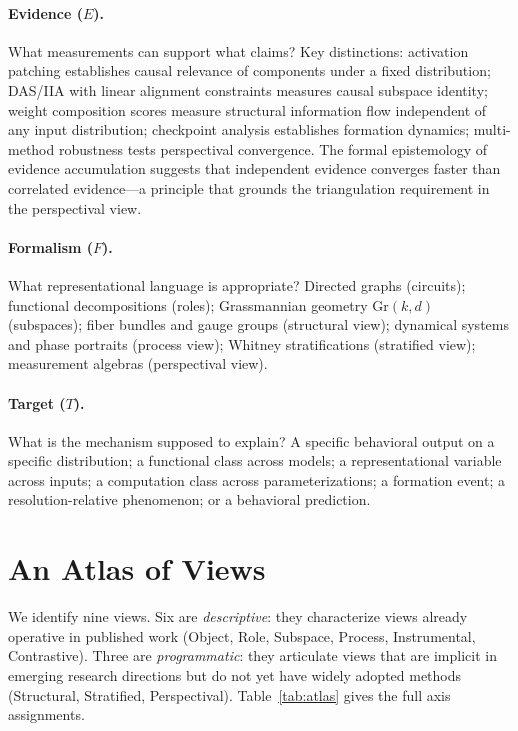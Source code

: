\documentclass{article}
\newcommand{\Gr}{\mathrm{Gr}}
\begin{document}
\paragraph{Evidence ($E$).}
What measurements can support what claims?  Key distinctions: activation
patching establishes causal relevance of components under a fixed
distribution; DAS/IIA with linear alignment constraints measures causal
subspace identity; weight composition scores measure structural
information flow independent of any input distribution; checkpoint
analysis establishes formation dynamics; multi-method robustness tests
perspectival convergence.  The formal epistemology of evidence
accumulation \citep{earman1992,howson1989} suggests that independent
evidence converges faster than correlated evidence---a principle that
grounds the triangulation requirement in the perspectival view.

\paragraph{Formalism ($F$).}
What representational language is appropriate?  Directed graphs (circuits);
functional decompositions (roles); Grassmannian geometry $\Gr(k,d)$
(subspaces); fiber bundles and gauge groups (structural view); dynamical
systems and phase portraits (process view); Whitney stratifications
(stratified view); measurement algebras (perspectival view).

\paragraph{Target ($T$).}
What is the mechanism supposed to explain?  A specific behavioral output
on a specific distribution; a functional class across models; a
representational variable across inputs; a computation class across
parameterizations; a formation event; a resolution-relative phenomenon;
or a behavioral prediction.

\section{An Atlas of Views}\label{sec:atlas}

We identify nine views.  Six are \emph{descriptive}: they characterize
views already operative in published work (Object, Role, Subspace,
Process, Instrumental, Contrastive).  Three are \emph{programmatic}:
they articulate views that are implicit in emerging research directions
but do not yet have widely adopted methods (Structural, Stratified,
Perspectival).
Table~\ref{tab:atlas} gives the full axis assignments.
\end{document}
